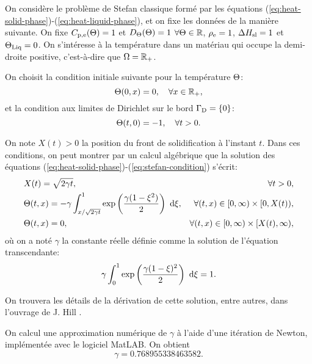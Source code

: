 On considère le problème de Stefan classique formé par les équations
(\ref{eq:heat-solid-phase})-(\ref{eq:heat-liquid-phase}), et on fixe
les données de la manière suivante. On fixe
$C_{\mathrm{p,e}}(\Theta) = 1$ et
$D_\Theta(\Theta)=1$ $\forall\Theta \in \mathbb
R$, $\rho_\mathrm{e} = 1$, $\Delta H_\mathrm{sl} = 1$ et $\Theta_\text{Liq} =
0$. On s'intéresse à la température dans un matériau qui occupe la
demi-droite positive, c'est-à-dire que $\Omega = \mathbb R_+$.

On choisit la condition initiale suivante pour la température
$\Theta$:
\begin{equation}
  \Theta(0, x) = 0, \quad \forall x\in\mathbb R_+,
\end{equation}
et la condition aux limites de Dirichlet sur le bord $\Gamma_\mathrm{D} =
\left\{ 0 \right\}$:
\begin{equation}
  \Theta(t, 0) = -1, \quad \forall t > 0.
\end{equation}

On note $X(t) > 0$ la position du front de solidification à l'instant
$t$. Dans ces conditions, on peut montrer par un calcul algébrique que
la solution des équations
(\ref{eq:heat-solid-phase})-(\ref{eq:stefan-condition}) s'écrit:
\begin{align}
  & X(t) = \sqrt{2\gamma t},& \forall t > 0,\label{eq:neumann-sol-frontier}\\
  & \temperature(t, x) = -\gamma\int_{x / \sqrt{2\gamma
      t}}^1\exp\parent{\frac{\gamma(1 - \xi^2)}{2}}\, \intd{\xi},%
  & \forall (t, x) \in [0,\infty)\times[0,X(t)),\label{eq:neumann-sol-solid-phase}\\
    & \temperature(t, x) = 0,
    & \forall (t, x) \in [0,\infty)\times[X(t), \infty),\label{eq:neumann-sol-liquid-phase}
\end{align}
où on a noté $\gamma$ la constante réelle définie comme la solution de
l'équation transcendante:
\begin{equation}
  \gamma \int_0^1\exp\left( \frac{\gamma(1 - \xi)^2}{2} \right)\,\,\mathrm d\xi
  = 1.
\end{equation}

On trouvera les détails de la dérivation de cette solution, entre
autres, dans l'ouvrage de J. Hill \cite{HillStefanProblems}.

On calcul une approximation numérique de $\gamma$ à l'aide d'une
itération de Newton, implémentée avec le logiciel MatLAB. On obtient
\begin{equation}\label{eq:gamma}
  \gamma =\num{0.768955338463582}.
\end{equation}

